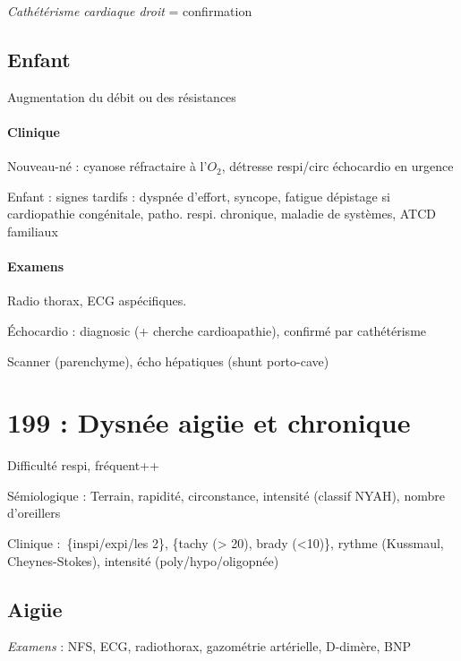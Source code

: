 \documentclass{article}
\begin{document}
\textit{Cathétérisme cardiaque droit}  = confirmation

\subsection{Enfant}

Augmentation du débit ou des résistances

\paragraph{Clinique}
Nouveau-né : cyanose réfractaire à l'$O_2$, détresse respi/circ \thus échocardio en
urgence \danger

Enfant : signes tardifs : dyspnée d'effort, syncope, fatigue
\thus dépistage si cardiopathie congénitale, patho. respi. chronique, maladie de
systèmes, ATCD familiaux

\paragraph{Examens}
Radio thorax, ECG aspécifiques.

Échocardio : diagnosic (+ cherche cardioapathie), confirmé par cathétérisme 

Scanner (parenchyme), écho hépatiques (shunt porto-cave)

\section{199 : Dysnée aigüe et chronique}%
\label{sec:199_dysnee_aigue_et_chronique}
Difficulté respi, fréquent++

Sémiologique : Terrain, rapidité, circonstance, intensité (classif NYAH), nombre d'oreillers

Clinique : \{inspi/expi/les 2\}, \{tachy (> 20), brady (<10)\}, rythme
(Kussmaul, Cheynes-Stokes), intensité (poly/hypo/oligopnée)

\subsection{Aigüe}
\textit{Examens}  : NFS, ECG, radiothorax, gazométrie artérielle, D-dimère, BNP
\end{document}
